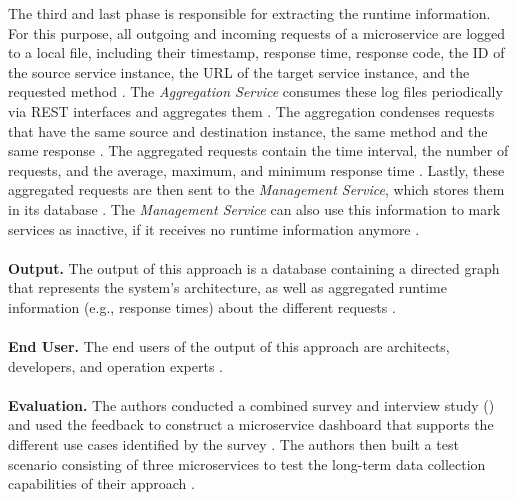 The third and last phase is responsible for extracting the runtime information.
For this purpose, all outgoing and incoming requests of a microservice are logged to a local file, including their timestamp, response time, response code, the ID of the source service instance, the URL of the target service instance, and the requested method \cite{Mayer2018}.
The \textit{Aggregation Service} consumes these log files periodically via REST interfaces and aggregates them \cite{Mayer2018}.
The aggregation condenses requests that have the same source and destination instance, the same method and the same response \cite{Mayer2018}.
The aggregated requests contain the time interval, the number of requests, and the average, maximum, and minimum response time \cite{Mayer2018}.
Lastly, these aggregated requests are then sent to the \textit{Management Service}, which stores them in its database \cite{Mayer2018}.
The \textit{Management Service} can also use this information to mark services as inactive, if it receives no runtime information anymore \cite{Mayer2018}.
\\ \\
\textbf{Output.}
The output of this approach is a database containing a directed graph that represents the system's architecture, as well as aggregated runtime information (e.g., response times) about the different requests \cite{Mayer2018}.
\\ \\
\textbf{End User.}
The end users of the output of this approach are architects, developers, and operation experts \cite{Mayer2018}.
\\ \\
\textbf{Evaluation.}
The authors conducted a combined survey and interview study (\cite{Mayer2017dashboard}) and used the feedback to construct a microservice dashboard that supports the different use cases identified by the survey \cite{Mayer2018}.
The authors then built a test scenario consisting of three microservices to test the long-term data collection capabilities of their approach \cite{Mayer2018}.



